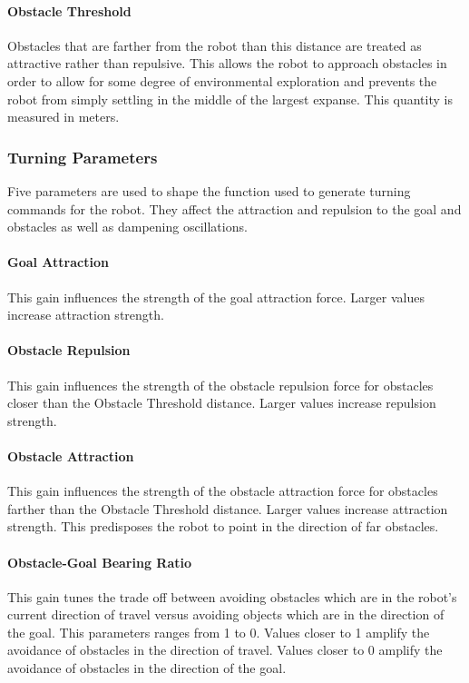 \paragraph{Obstacle Threshold}
Obstacles that are farther from the robot than this distance are treated as attractive
rather than repulsive. This allows the robot to approach obstacles in order to allow
for some degree of environmental exploration and prevents the robot from simply settling in the middle of
the largest expanse. This quantity is measured in meters.

\subsubsection{Turning Parameters}
Five parameters are used to shape the function used to generate
turning commands for the robot. They affect the attraction and repulsion
to the goal and obstacles as well as dampening oscillations.

\paragraph{Goal Attraction}            
This gain influences the strength of the goal attraction force.
Larger values increase attraction strength. 

\paragraph{Obstacle Repulsion}  
This gain influences the strength of the obstacle repulsion force for 
obstacles closer than the Obstacle Threshold distance.
Larger values increase repulsion strength. 

\paragraph{Obstacle Attraction}        
This gain influences the strength of the obstacle attraction force for 
obstacles farther than the Obstacle Threshold distance.
Larger values increase attraction strength. This predisposes the robot
to point in the direction of far obstacles.

\paragraph{Obstacle-Goal Bearing Ratio}  
This gain tunes the trade off between avoiding obstacles which are in the robot's 
current direction of travel versus avoiding objects which are in the direction of the goal.
This parameters ranges from 1 to 0. 
Values closer to 1 amplify the avoidance of obstacles in the direction of travel.
Values closer to 0 amplify the avoidance of obstacles in the direction of the goal. 

